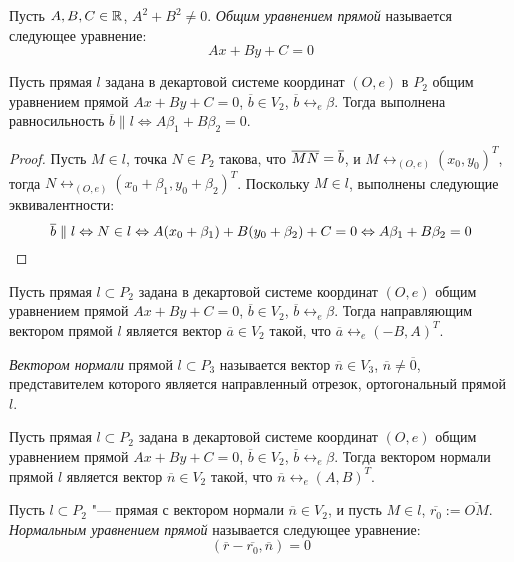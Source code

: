 \begin{definition}
	Пусть $A, B, C \in \mathbb{R}$, $A^2+B^2 \ne 0$. \textit{Общим уравнением прямой} называется следующее уравнение:
	\[Ax+By+C = 0\]
\end{definition}

\begin{proposition}
	Пусть прямая $l$ задана в декартовой системе координат $(O, e)$ в $P_2$ общим уравнением прямой $Ax+By+C=0$, $\overline{b} \in V_2$, $\overline{b} \leftrightarrow_{e} \beta$. Тогда выполнена равносильность $\overline{b} \parallel l \Leftrightarrow A\beta_1 + B\beta_2 = 0$.
\end{proposition}

\begin{proof}
	Пусть $M \in l$, точка $N \in P_2$ такова, что $\overline{MN} \hm{=} \overline{b}$, и $M \leftrightarrow_{(O, e)} (x_0, y_0)^T$, тогда $N \leftrightarrow_{(O, e)} (x_0 + \beta_1, y_0 + \beta_2)^T$. Поскольку $M \in l$, выполнены следующие эквивалентности:
	\[\overline{b} \parallel l \Leftrightarrow N \in l \Leftrightarrow A(x_0 + \beta_1) + B(y_0 + \beta_2) + C = 0 \Leftrightarrow A\beta_1 + B\beta_2 = 0\qedhere\]
\end{proof}

\begin{corollary}
	Пусть прямая $l \subset P_2$ задана в декартовой системе координат $(O, e)$ общим уравнением прямой $Ax+By+C=0$, $\overline{b} \in V_2$, $\overline{b} \leftrightarrow_{e} \beta$. Тогда направляющим вектором прямой $l$ является вектор $\overline{a} \in V_2$ такой, что $\overline a \leftrightarrow_{e} (-B, A)^T$.
\end{corollary}

\begin{definition}
	\textit{Вектором нормали} прямой $l \subset P_3$ называется вектор $\overline{n} \in V_3$, $\overline{n} \ne \overline 0$, представителем которого является направленный отрезок, ортогональный прямой $l$.
\end{definition}

\begin{corollary}
	Пусть прямая $l \subset P_2$ задана в декартовой системе координат $(O, e)$ общим уравнением прямой $Ax+By+C=0$, $\overline{b} \in V_2$, $\overline{b} \leftrightarrow_{e} \beta$. Тогда вектором нормали прямой $l$ является вектор $\overline{n} \in V_2$ такой, что $\overline n \leftrightarrow_{e} (A, B)^T$.
\end{corollary}

\begin{definition}
	Пусть $l \subset P_2$ "--- прямая с вектором нормали $\overline{n} \in V_2$, и пусть $M \in l$, $\overline{r_0} := \overline{OM}$. \textit{Нормальным уравнением прямой} называется следующее уравнение:
	\[(\overline{r} - \overline{r_0}, \overline{n}) = 0\]
\end{definition}

